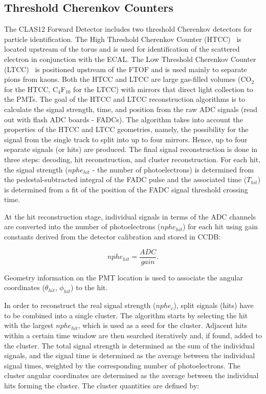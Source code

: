 \subsection{Threshold Cherenkov Counters}

The CLAS12 Forward Detector includes two threshold Cherenkov detectors for particle identification. The
High Threshold Cherenkov Counter (HTCC)~\cite{htcc-nim} is located upstream of the torus and is used for
identification of the scattered electron in conjunction with the ECAL. The Low Threshold Cherenkov Counter
(LTCC)~\cite{ltcc-nim} is positioned upstream of the FTOF and is used mainly to separate pions from kaons.
Both the HTCC and LTCC are large gas-filled volumes (CO$_2$ for the HTCC, C$_4$F$_{10}$ for the LTCC)
with mirrors that direct light collection to the PMTs. The goal of the HTCC and LTCC reconstruction algorithms
is to calculate the signal strength, time, and position from the raw ADC signals (read out with flash ADC boards
- FADCs). The algorithm takes into account the properties of the HTCC and LTCC geometries, namely, the
possibility for the signal from the single track to split into up to four mirrors. Hence, up to four separate
signals (or hits) are produced. The final signal reconstruction is done in three steps: decoding, hit reconstruction,
and cluster reconstruction. For each hit, the signal strength ($nphe_{hit}$ - the number of photoelectrons) is
determined from the pedestal-subtracted integral of the FADC pulse and the associated time ($T_{hit}$) is
determined from a fit of the position of the FADC signal threshold crossing time.

At the hit reconstruction stage, individual signals in terms of the ADC channels are converted into the number of
photoelectrons ($nphe_{hit}$) for each hit using gain constants derived from the detector calibration and stored
in CCDB:

\begin{equation}
nphe_{hit} = \frac{ADC}{gain}.
\end{equation}

\noindent
Geometry information on the PMT location is used to associate the angular coordinates ($\theta_{hit}$, $\phi_{hit}$)
to the hit.

In order to reconstruct the real signal strength ($nphe_c$), split signals (hits) have to be combined into a single
cluster. The algorithm starts by selecting the hit with the largest $nphe_{hit}$, which is used as a seed for the
cluster. Adjacent hits within a certain time window are then searched iteratively and, if found, added to the
cluster. The total signal strength is determined as the sum of the individual signals, and the signal time is
determined as the average between the individual signal times, weighted by the corresponding number of
photoelectrons. The cluster angular coordinates are determined as the average between the individual hits forming
the cluster. The cluster quantities are defined by:

